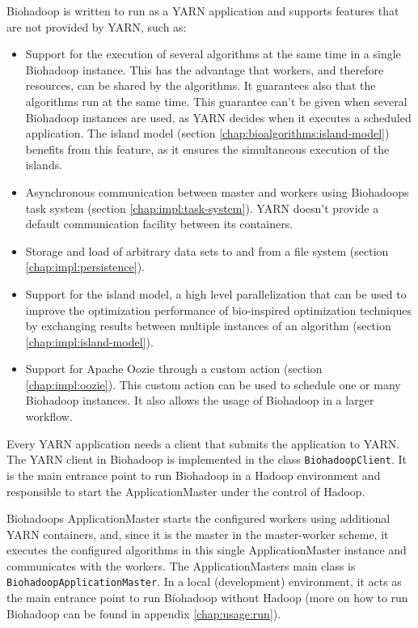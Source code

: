Biohadoop is written to run as a YARN application and supports features that are not provided by YARN, such as:

\begin{itemize}
  \item Support for the execution of several algorithms at the same time in a single Biohadoop instance. This has the advantage that workers, and therefore resources, can be shared by the algorithms. It guarantees also that the algorithms run at the same time. This guarantee can't be given when several Biohadoop instances are used, as YARN decides when it executes a scheduled application. The island model (section \ref{chap:bioalgorithms:island-model}) benefits from this feature, as it ensures the simultaneous execution of the islands.
  \item Asynchronous communication between master and workers using Biohadoops task system (section \ref{chap:impl:task-system}). YARN doesn't provide a default communication facility between its containers.
  \item Storage and load of arbitrary data sets to and from a file system (section \ref{chap:impl:persistence}).
  \item Support for the island model, a high level parallelization that can be used to improve the optimization performance of bio-inspired optimization techniques by exchanging results between multiple instances of an algorithm (section \ref{chap:impl:island-model}).
  \item Support for Apache Oozie through a custom action (section \ref{chap:impl:oozie}). This custom action can be used to schedule one or many Biohadoop instances. It also allows the usage of Biohadoop in a larger workflow.
\end{itemize}

Every YARN application needs a client that submits the application to YARN. The YARN client in Biohadoop is implemented in the class \texttt{BiohadoopClient}. It is the main entrance point to run Biohadoop in a Hadoop environment and responsible to start the ApplicationMaster under the control of Hadoop.

Biohadoops ApplicationMaster starts the configured workers using additional YARN containers, and, since it is the master in the master-worker scheme, it executes the configured algorithms in this single ApplicationMaster instance and communicates with the workers. The ApplicationMasters main class is \texttt{BiohadoopApplicationMaster}. In a local (development) environment, it acts as the main entrance point to run Biohadoop without Hadoop (more on how to run Biohadoop can be found in appendix \ref{chap:usage:run}).

